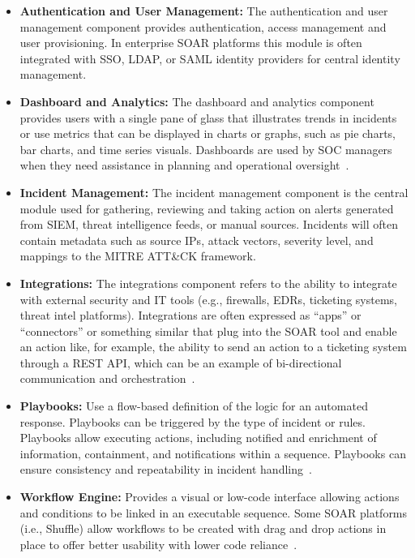 \begin{itemize}
    \item \textbf{Authentication and User Management:} The authentication and user management component provides authentication, access management and user provisioning. In enterprise SOAR platforms this module is often integrated with SSO, LDAP, or SAML identity providers for central identity management.
    
    \item \textbf{Dashboard and Analytics:} The dashboard and analytics component provides users with a single pane of glass that illustrates trends in incidents or use metrics that can be displayed in charts or graphs, such as pie charts, bar charts, and time series visuals. Dashboards are used by SOC managers when they need assistance in planning and operational oversight~\cite{paloalto}.

    \item \textbf{Incident Management:} The incident management component is the central module used for gathering, reviewing and taking action on alerts generated from SIEM, threat intelligence feeds, or manual sources. Incidents will often contain metadata such as source IPs, attack vectors, severity level, and mappings to the MITRE ATT\&CK framework.

    \item \textbf{Integrations:} The integrations component refers to the ability to integrate with external security and IT tools (e.g., firewalls, EDRs, ticketing systems, threat intel platforms). Integrations are often expressed as “apps” or “connectors” or something similar that plug into the SOAR tool and enable an action like, for example, the ability to send an action to a ticketing system through a REST API, which can be an example of bi-directional communication and orchestration~\cite{techtarget}.

    \item \textbf{Playbooks:} Use a flow-based definition of the logic for an automated response. Playbooks can be triggered by the type of incident or rules. Playbooks allow executing actions, including notified and enrichment of information, containment, and notifications within a sequence. Playbooks can ensure consistency and repeatability in incident handling~\cite{splunk, paloalto}.

    \item \textbf{Workflow Engine:} Provides a visual or low-code interface allowing actions and conditions to be linked in an executable sequence. Some SOAR platforms (i.e., Shuffle) allow workflows to be created with drag and drop actions in place to offer better usability with lower code reliance~\cite{techtarget}.


\end{itemize}
